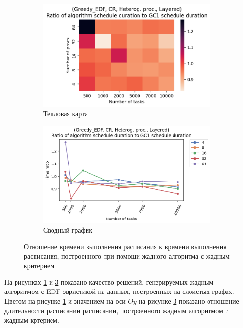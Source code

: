 \begin{figure}[!htbp]
    \centering
    \begin{subfigure}{0.49\textwidth}
        \includegraphics[width=\textwidth]{imgs/unbalanced/CR_EDF/times.png}
        \caption{Тепловая карта}
        \label{fig:CR-disbalanced-EDF-times-heatmap}
    \end{subfigure}
    \hfill
    \begin{subfigure}{0.49\textwidth}
        \includegraphics[width=\textwidth]{imgs/unbalanced/CR_EDF/gr_amalgamated.png}
        \caption{Сводный график}
        \label{fig:CR-disbalanced-EDF-times-compiled} 
    \end{subfigure}
    \caption{Отношение времени выполнения расписания к времени выполнения расписания, построенного при помощи жадного алгоритма с жадным критерием}
\end{figure}

На рисунках \ref{fig:CR-disbalanced-EDF-times-heatmap} и \ref{fig:CR-disbalanced-EDF-times-compiled} показано качество решений, генерируемых жадным алгоритмом с EDF эвристикой на данных, построенных на слоистых графах. Цветом на рисунке \ref{fig:CR-disbalanced-EDF-times-heatmap} и значением на оси $Oy$ на рисунке \ref{fig:CR-disbalanced-EDF-times-compiled} показано отношение длительности расписании расписании, построенного жадным алгоритмом с жадным кртерием.

